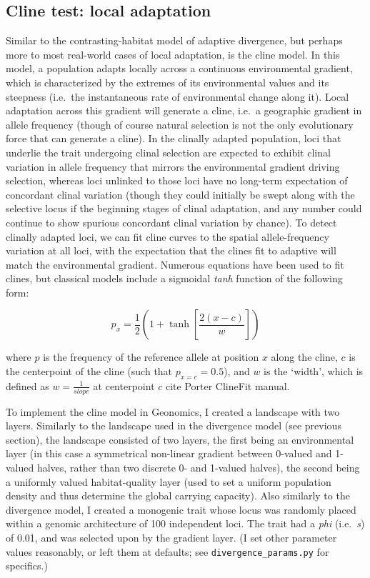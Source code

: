﻿\documentclass{article}
\begin{document}
\subsection{Cline test: local adaptation}
Similar to the contrasting-habitat model of adaptive divergence, but perhaps more
to most real-world cases of local adaptation, is the cline model. In this model,
a population adapts locally across a continuous environmental gradient,
which is characterized by the extremes of its environmental values and its steepness
(i.e.\ the instantaneous rate of environmental change along it). Local adaptation
across this gradient will generate a cline, i.e.\ a geographic gradient in allele frequency
(though of course natural selection is not the only evolutionary force that can
generate a cline). In the clinally adapted population, loci that underlie the trait
undergoing clinal selection are expected to exhibit clinal variation in allele frequency
that mirrors the environmental gradient driving selection, whereas loci unlinked to 
those loci have no long-term expectation of concordant clinal variation (though they could
initially be swept along with the selective locus if the beginning stages of clinal
adaptation, and any number could continue to show spurious concordant clinal variation
by chance). To detect clinally adapted loci, we can fit cline curves to the spatial
allele-frequency variation at all loci, with the expectation that the clines fit to
adaptive will match the environmental gradient. Numerous equations have been used
to fit clines, but classical models include a sigmoidal \emph{tanh} function
of the following form:

\begin{equation}
p_{x} = \frac{1}{2}(1 + \tanh[\frac{2(x - c)}{w}])
\end{equation}

where $p$ is the frequency of the reference allele at position $x$ along the cline,
$c$ is the centerpoint of the cline (such that $p_{x=c} = 0.5$), and $w$ is the 
`width', which is defined as $w = \frac{1}{slope}$ at centerpoint
$c$ {\large cite Porter ClineFit manual}.

To implement the cline model in Geonomics, I created a landscape with two layers.
Similarly to the landscape used in the divergence model (see previous section), the
landscape consisted of two layers, the first being an environmental layer (in this case a
symmetrical non-linear gradient between 0-valued and 1-valued halves, rather than two
discrete 0- and 1-valued halves), the second being a uniformly valued
habitat-quality layer (used to set a uniform population density and thus determine
the global carrying capacity). Also similarly to the divergence model, I created a
monogenic trait whose locus was randomly placed within a genomic architecture of 
100 independent loci. The trait had a \emph{phi} (i.e.\ \emph{s}) of 0.01,
and was selected upon by the gradient layer.
(I set other parameter values reasonably, or left them
at defaults; see \texttt{divergence\_params.py} for specifics.)
\end{document}
